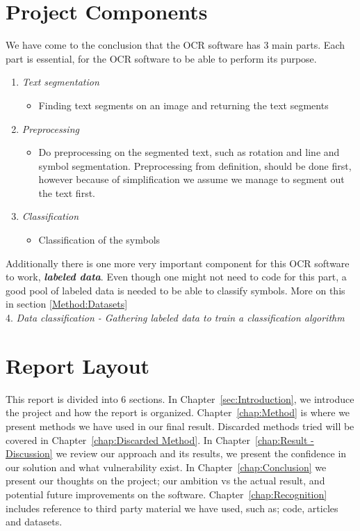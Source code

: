 \documentclass[Report.tex]{subfiles}
\begin{document}
\section{Project Components}
We have come to the conclusion that the OCR software has 3 main parts. Each
part is essential, for the OCR software to be able to perform its purpose.
\begin{enumerate}
 \item{\textit{Text segmentation}}
 \begin{itemize}
  \item{Finding text segments on an image and returning the text segments}
 \end{itemize}
 \item{\textit{Preprocessing}}
 \begin{itemize}
  \item{Do preprocessing on the segmented text, such as rotation and line and
  symbol segmentation. Preprocessing from definition, should be done first,
  however because of simplification we assume we manage to segment out the text
  first.}
 \end{itemize}
 \item{\textit{Classification}}
 \begin{itemize}
  \item{Classification of the symbols}
 \end{itemize}
\end{enumerate}

\begin{flushleft}
  Additionally there is one more very important component for this
  OCR software to work, \textit{\textbf{labeled data}}. Even though one might not
  need to code for this part, a good pool of labeled data is needed to be able to
  classify symbols. More on this in section \ref{Method:Datasets} \\
  4. \textit{Data classification - Gathering labeled data to train a classification algorithm}
\end{flushleft}

\section{Report Layout}
\label{subsec:Report Layout}
This report is divided into 6 sections. In
Chapter~\ref{sec:Introduction}, we introduce the project and how the report
is organized. Chapter~\ref{chap:Method} is where we present methods we have
used in our final result. Discarded methods tried will be covered in Chapter~\ref{chap:Discarded Method}.
In Chapter~\ref{chap:Result - Discussion} we review our approach and
its results, we present the confidence in our solution and what vulnerability
exist. In Chapter~\ref{chap:Conclusion} we present our thoughts on the project;
our ambition vs the actual result, and potential future improvements on the software.
Chapter~\ref{chap:Recognition} includes reference to third party
material we have used, such as; code, articles and datasets.
\end{document}
